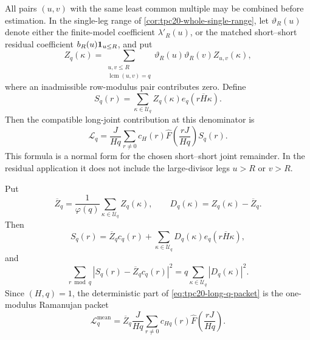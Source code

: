 All pairs \((u,v)\) with the same least common multiple may be combined
before estimation.  In the single-leg range of
\cref{cor:tpc20-whole-single-range}, let \(\vartheta_R(u)\) denote either
the finite-model coefficient \(\lambda'_R(u)\), or the matched
short--short residual coefficient \(b_R(u)\mathbf 1_{u\le R}\), and put
\begin{equation}
 Z_q(\kappa)
 =\sum_{\substack{u,v\le R\\\operatorname{lcm}(u,v)=q}}
 \vartheta_R(u)\vartheta_R(v)Z_{u,v}(\kappa),
 \label{eq:tpc20-aggregated-fiber}
\end{equation}
where an inadmissible row-modulus pair contributes zero.  Define
\begin{equation}
 S_q(r)=\sum_{\kappa\in\mathcal U_q}
 Z_q(\kappa)e_q(r\overline H\kappa).
 \label{eq:tpc20-aggregated-DFT}
\end{equation}
Then the compatible long-joint contribution at this denominator is
\begin{equation}
 \mathcal L_q
 =\frac{J}{Hq}\sum_{r\ne0}
 c_H(r)\widehat F\!\left(\frac{rJ}{Hq}\right)S_q(r).
 \label{eq:tpc20-long-q-packet}
\end{equation}
This formula is a normal form for the chosen short--short joint
remainder.  In the residual application it does not include the
large-divisor legs \(u>R\) or \(v>R\).

\begin{theorem}
\label{thm:tpc20-mean-discrepancy}
Put
\begin{equation}
 \overline Z_q
 =\frac1{\varphi(q)}\sum_{\kappa\in\mathcal U_q}Z_q(\kappa),
 \qquad
 D_q(\kappa)=Z_q(\kappa)-\overline Z_q.
 \label{eq:tpc20-fiber-mean-discrepancy}
\end{equation}
Then
\begin{equation}
 S_q(r)
 =\overline Z_q c_q(r)
 +\sum_{\kappa\in\mathcal U_q}
 D_q(\kappa)e_q(r\overline H\kappa),
 \label{eq:tpc20-DFT-mean-split}
\end{equation}
and
\begin{equation}
 \boxed{
 \sum_{r\bmod q}
 |S_q(r)-\overline Z_qc_q(r)|^2
 =q\sum_{\kappa\in\mathcal U_q}|D_q(\kappa)|^2.}
 \label{eq:tpc20-discrepancy-parseval}
\end{equation}
Since \((H,q)=1\), the deterministic part of
\eqref{eq:tpc20-long-q-packet} is the one-modulus Ramanujan packet
\begin{equation}
 \mathcal L_q^{\mathrm{mean}}
 =\overline Z_q\frac{J}{Hq}\sum_{r\ne0}
 c_{Hq}(r)\widehat F\!\left(\frac{rJ}{Hq}\right).
 \label{eq:tpc20-Ramanujan-mean-packet}
\end{equation}
\end{theorem}

